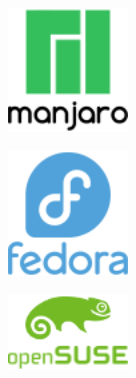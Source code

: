 \documentclass[aspectratio=43]{beamer}
\begin{document}
\begin{frame}{\subsecname}{}
\begin{figure}[b]
            \\\medskip
            \begin{subfigure}{.3\textwidth}
                \centering
                \includegraphics[width=0.35\textwidth]{img/manjaro.png}
            \end{subfigure}
            \centering
            \begin{subfigure}{.3\textwidth}
                \centering
                \includegraphics[width=0.35\textwidth]{img/fedora.png}
            \end{subfigure}
            \begin{subfigure}{.3\textwidth}
                \centering
                \includegraphics[width=0.35\textwidth]{img/opensuse.png}
            \end{subfigure}
        \end{figure}

        \medskip


\end{frame}
\end{document}
